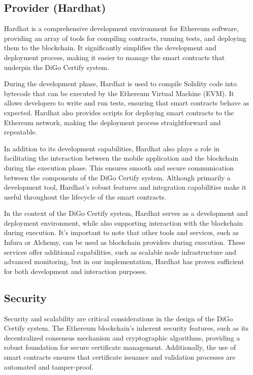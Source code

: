 \subsection{Provider (Hardhat)}

Hardhat is a comprehensive development environment for Ethereum software, providing an array of tools for compiling contracts, running tests, and deploying them to the blockchain. It significantly simplifies the development and deployment process, making it easier to manage the smart contracts that underpin the DiGo Certify system.

During the development phase, Hardhat is used to compile Solidity code into bytecode that can be executed by the Ethereum Virtual Machine (EVM). It allows developers to write and run tests, ensuring that smart contracts behave as expected. Hardhat also provides scripts for deploying smart contracts to the Ethereum network, making the deployment process straightforward and repeatable.

In addition to its development capabilities, Hardhat also plays a role in facilitating the interaction between the mobile application and the blockchain during the execution phase. This ensures smooth and secure communication between the components of the DiGo Certify system. Although primarily a development tool, Hardhat's robust features and integration capabilities make it useful throughout the lifecycle of the smart contracts.

In the context of the DiGo Certify system, Hardhat serves as a development and deployment environment, while also supporting interaction with the blockchain during execution. It's important to note that other tools and services, such as Infura or Alchemy, can be used as blockchain providers during execution. These services offer additional capabilities, such as scalable node infrastructure and advanced monitoring, but in our implementation, Hardhat has proven sufficient for both development and interaction purposes.

\subsection{Security}

Security and scalability are critical considerations in the design of the DiGo Certify system. The Ethereum blockchain’s inherent security features, such as its decentralized consensus mechanism and cryptographic algorithms, providing a robust foundation for secure certificate management. Additionally, the use of smart contracts ensures that certificate issuance and validation processes are automated and tamper-proof\cite{Wood2014}.

